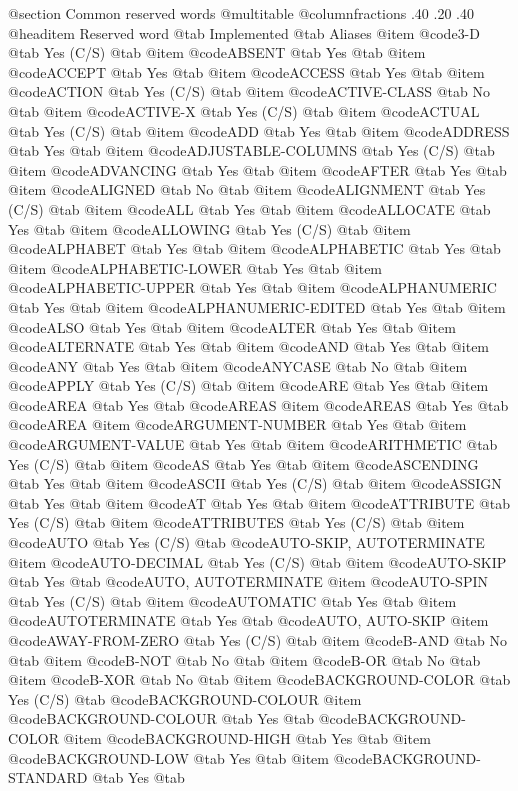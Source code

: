 @section Common reserved words
@multitable @columnfractions .40 .20 .40
@headitem Reserved word @tab Implemented @tab Aliases
@item @code{3-D} @tab Yes	(C/S) @tab 
@item @code{ABSENT} @tab Yes @tab 
@item @code{ACCEPT} @tab Yes @tab 
@item @code{ACCESS} @tab Yes @tab 
@item @code{ACTION} @tab Yes	(C/S) @tab 
@item @code{ACTIVE-CLASS} @tab No @tab 
@item @code{ACTIVE-X} @tab Yes	(C/S) @tab 
@item @code{ACTUAL} @tab Yes	(C/S) @tab 
@item @code{ADD} @tab Yes @tab 
@item @code{ADDRESS} @tab Yes @tab 
@item @code{ADJUSTABLE-COLUMNS} @tab Yes	(C/S) @tab 
@item @code{ADVANCING} @tab Yes @tab 
@item @code{AFTER} @tab Yes @tab 
@item @code{ALIGNED} @tab No @tab 
@item @code{ALIGNMENT} @tab Yes	(C/S) @tab 
@item @code{ALL} @tab Yes @tab 
@item @code{ALLOCATE} @tab Yes @tab 
@item @code{ALLOWING} @tab Yes	(C/S) @tab 
@item @code{ALPHABET} @tab Yes @tab 
@item @code{ALPHABETIC} @tab Yes @tab 
@item @code{ALPHABETIC-LOWER} @tab Yes @tab 
@item @code{ALPHABETIC-UPPER} @tab Yes @tab 
@item @code{ALPHANUMERIC} @tab Yes @tab 
@item @code{ALPHANUMERIC-EDITED} @tab Yes @tab 
@item @code{ALSO} @tab Yes @tab 
@item @code{ALTER} @tab Yes @tab 
@item @code{ALTERNATE} @tab Yes @tab 
@item @code{AND} @tab Yes @tab 
@item @code{ANY} @tab Yes @tab 
@item @code{ANYCASE} @tab No @tab 
@item @code{APPLY} @tab Yes	(C/S) @tab 
@item @code{ARE} @tab Yes @tab 
@item @code{AREA} @tab Yes @tab @code{AREAS}
@item @code{AREAS} @tab Yes @tab @code{AREA}
@item @code{ARGUMENT-NUMBER} @tab Yes @tab 
@item @code{ARGUMENT-VALUE} @tab Yes @tab 
@item @code{ARITHMETIC} @tab Yes	(C/S) @tab 
@item @code{AS} @tab Yes @tab 
@item @code{ASCENDING} @tab Yes @tab 
@item @code{ASCII} @tab Yes	(C/S) @tab 
@item @code{ASSIGN} @tab Yes @tab 
@item @code{AT} @tab Yes @tab 
@item @code{ATTRIBUTE} @tab Yes	(C/S) @tab 
@item @code{ATTRIBUTES} @tab Yes	(C/S) @tab 
@item @code{AUTO} @tab Yes	(C/S) @tab @code{AUTO-SKIP, AUTOTERMINATE}
@item @code{AUTO-DECIMAL} @tab Yes	(C/S) @tab 
@item @code{AUTO-SKIP} @tab Yes @tab @code{AUTO, AUTOTERMINATE}
@item @code{AUTO-SPIN} @tab Yes	(C/S) @tab 
@item @code{AUTOMATIC} @tab Yes @tab 
@item @code{AUTOTERMINATE} @tab Yes @tab @code{AUTO, AUTO-SKIP}
@item @code{AWAY-FROM-ZERO} @tab Yes	(C/S) @tab 
@item @code{B-AND} @tab No @tab 
@item @code{B-NOT} @tab No @tab 
@item @code{B-OR} @tab No @tab 
@item @code{B-XOR} @tab No @tab 
@item @code{BACKGROUND-COLOR} @tab Yes	(C/S) @tab @code{BACKGROUND-COLOUR}
@item @code{BACKGROUND-COLOUR} @tab Yes @tab @code{BACKGROUND-COLOR}
@item @code{BACKGROUND-HIGH} @tab Yes @tab 
@item @code{BACKGROUND-LOW} @tab Yes @tab 
@item @code{BACKGROUND-STANDARD} @tab Yes @tab 
